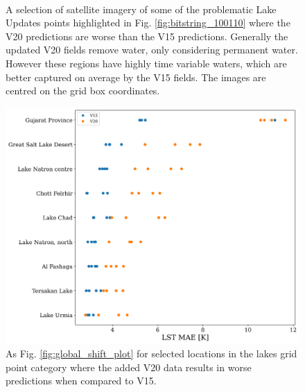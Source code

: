 \documentclass[hess, twostagejnl]{copernicus}
\begin{document}
\begin{figure}
	 \hspace{1mm}
	 \hspace{1mm} \\
	\caption{A selection of satellite imagery of some of the problematic Lake Updates points highlighted in Fig. \ref{fig:bitstring_100110} where the V20 predictions are worse than the V15 predictions. Generally the updated V20 fields remove water, only considering permanent water. However these regions have highly time variable waters, which are better captured on average by the V15 fields. The images are centred on the grid box coordinates.} 
	\label{fig:example_test}
\end{figure}


\begin{figure}
	\includegraphics[width=\columnwidth]{selected_points_shift_plot_new}
	\caption{As Fig. \ref{fig:global_shift_plot} for selected locations in the lakes grid point category where the added V20 data results in worse predictions when compared to V15.} 
	\label{fig:lake_sub_categories}
\end{figure}
\end{document}

